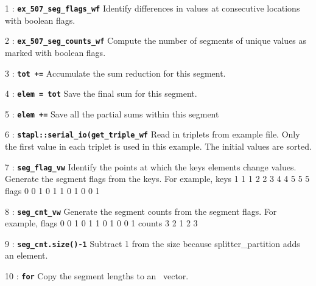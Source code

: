 \documentclass{report}
\begin{document}
\begin{hashitemize}
\item 1 : \texttt{{\bf ex\_507\_seg\_flags\_wf}}
\newline
Identify differences in values at consecutive locations with boolean flags.

\item 2 : \texttt{{\bf ex\_507\_seg\_counts\_wf}}
\newline
Compute the number of segments of unique values as marked with boolean flags.

\item 3 : \texttt{{\bf tot +=}}
\newline
Accumulate the sum reduction for this segment.

\item 4 : \texttt{{\bf elem = tot}}
\newline
Save the final sum for this segment.

\item 5 : \texttt{{\bf elem +=}}
\newline
Save all the partial sums within this segment

\item 6 : \texttt{{\bf stapl::serial\_io(get\_triple\_wf}}
\newline
Read in triplets from example file.  Only the first value in each
triplet is used in this example.  The initial values are sorted.

\item 7 : \texttt{{\bf seg\_flag\_vw}}
\newline
Identify the points at which the keys elements change values.
Generate the segment flags from the keys.  For example,
\newline
keys   1 1 1 2 2 3 4 4 5 5 5
\newline
flags  0 0 1 0 1 1 0 1 0 0 1

\item 8 : \texttt{{\bf seg\_cnt\_vw}}
\newline
Generate the segment counts from the segment flags.  For example,
\newline
flags   0 0 1 0 1 1 0 1 0 0 1
\newline
counts  3 2 1 2 3

\item 9 : \texttt{{\bf seg\_cnt.size()-1}}
\newline
Subtract 1 from the size because splitter\_partition adds an element.

\item 10 : \texttt{{\bf for}}
\newline
Copy the segment lengths to an \stl\ vector.


\end{hashitemize}
\end{document}
